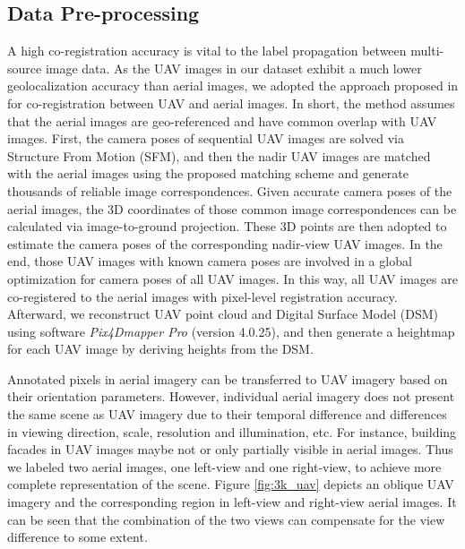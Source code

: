\subsection{Data Pre-processing}
A high co-registration accuracy is vital to the label propagation between multi-source image data. As the UAV images in our dataset exhibit a much lower geolocalization accuracy than aerial images, we adopted the approach proposed in \cite{zhuo2017automatic} for co-registration between UAV and aerial images. In short, the method assumes that the aerial images are geo-referenced and have common overlap with UAV images. First, the camera poses of sequential UAV images are solved via Structure From Motion (SFM), and then the nadir UAV images are matched with the aerial images using the proposed matching scheme and generate thousands of reliable image correspondences. Given accurate camera poses of the aerial images, the 3D coordinates of those common image correspondences can be calculated via image-to-ground projection. These 3D points are then adopted to estimate the camera poses of the corresponding nadir-view UAV images. In the end, those UAV images with known camera poses are involved in a global optimization for camera poses of all UAV images. In this way, all UAV images are co-registered to the aerial images with pixel-level registration accuracy. Afterward, we reconstruct UAV point cloud and Digital Surface Model (DSM) using software \textit{Pix4Dmapper Pro} (version 4.0.25), and then generate a heightmap for each UAV image by deriving heights from the DSM.

Annotated pixels in aerial imagery can be transferred to UAV imagery based on their orientation parameters. However, individual aerial imagery does not present the same scene as UAV imagery due to their temporal difference and differences in viewing direction, scale, resolution and illumination, etc. For instance, building facades in UAV images maybe not or only partially visible in aerial images. Thus we labeled two aerial images, one left-view and one right-view, to achieve more complete representation of the scene. Figure \ref{fig:3k_uav} depicts an oblique UAV imagery and the corresponding region in left-view and right-view aerial images. It can be seen that the combination of the two views can compensate for the view difference to some extent. 

